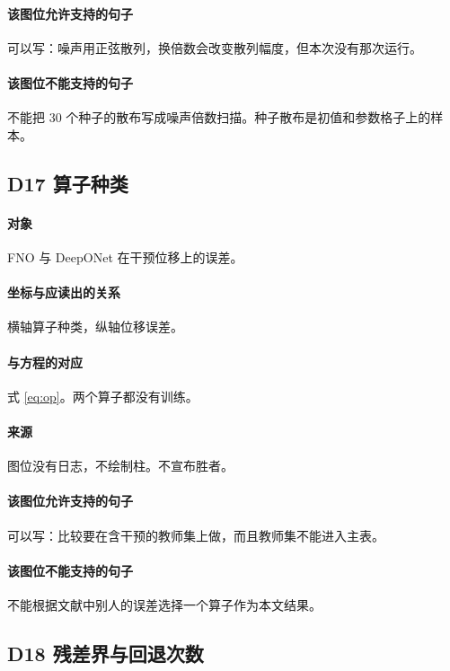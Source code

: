 \paragraph{该图位允许支持的句子}
可以写：噪声用正弦散列，换倍数会改变散列幅度，但本次没有那次运行。

\paragraph{该图位不能支持的句子}
不能把 30 个种子的散布写成噪声倍数扫描。种子散布是初值和参数格子上的样本。

\subsection{D17 算子种类}
\paragraph{对象}
FNO 与 DeepONet 在干预位移上的误差。

\paragraph{坐标与应读出的关系}
横轴算子种类，纵轴位移误差。

\paragraph{与方程的对应}
式 \eqref{eq:op}。两个算子都没有训练。

\paragraph{来源}
图位没有日志，不绘制柱。不宣布胜者。

\paragraph{该图位允许支持的句子}
可以写：比较要在含干预的教师集上做，而且教师集不能进入主表。

\paragraph{该图位不能支持的句子}
不能根据文献中别人的误差选择一个算子作为本文结果。

\subsection{D18 残差界与回退次数}
